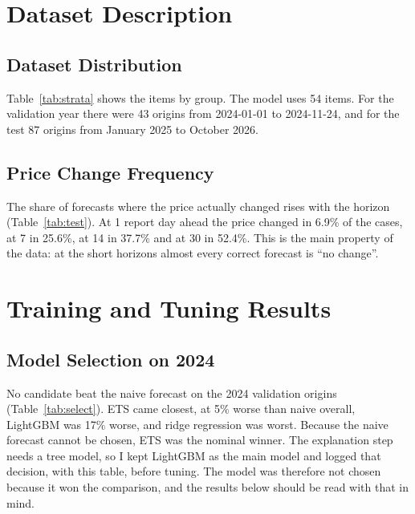 \section{Dataset Description}

\subsection{Dataset Distribution}
Table~\ref{tab:strata} shows the items by group. The model uses 54 items. For the validation year there were 43 origins from 2024-01-01 to 2024-11-24, and for the test 87 origins from January 2025 to October 2026.

\subsection{Price Change Frequency}
The share of forecasts where the price actually changed rises with the horizon (Table~\ref{tab:test}). At 1 report day ahead the price changed in 6.9\% of the cases, at 7 in 25.6\%, at 14 in 37.7\% and at 30 in 52.4\%. This is the main property of the data: at the short horizons almost every correct forecast is ``no change''.

\section{Training and Tuning Results}

\subsection{Model Selection on 2024}
No candidate beat the naive forecast on the 2024 validation origins (Table~\ref{tab:select}). ETS came closest, at 5\% worse than naive overall, LightGBM was 17\% worse, and ridge regression was worst. Because the naive forecast cannot be chosen, ETS was the nominal winner. The explanation step needs a tree model, so I kept LightGBM as the main model and logged that decision, with this table, before tuning. The model was therefore not chosen because it won the comparison, and the results below should be read with that in mind.

\begin{table}[H]\centering\small
\caption[Validation on 2024, six candidate models]{Validation on 2024, 43 origins, all four horizons. Lower is better; relative error 1.000 is a tie with ``tomorrow equals today''.}\label{tab:select}

\par{}
\end{table}


